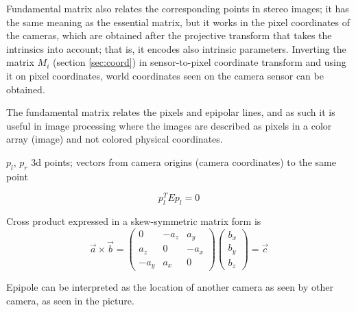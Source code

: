 Fundamental matrix also relates the corresponding points in stereo images; it has the same meaning as the essential matrix, but it works in the pixel coordinates of the cameras, which are obtained after the projective transform that takes the intrinsics into account; that is, it encodes also intrinsic parameters.
Inverting the matrix $M_i$ (section \ref{sec:coord}) in sensor-to-pixel coordinate transform and using it on pixel coordinates, world coordinates seen on the camera sensor can be obtained. %

%
%
%
%

The fundamental matrix relates the pixels and epipolar lines, and as such it is useful in image processing where the images are described as pixels in a color array (image) and not colored physical coordinates.

$p_l$, $p_r$ 3d points; vectors from camera origins (camera coordinates) to the same point

\[
	p_l^T E p_l = 0
\]


Cross product expressed in a skew-symmetric matrix form is
\begin{equation}
\vec a \times \vec b =
\begin{pmatrix}
	 0   & -a_z &  a_y\\
	 a_z &  0   & -a_x\\
	-a_y &  a_x & 0
\end{pmatrix}
\begin{pmatrix}
	b_x\\b_y\\b_z
\end{pmatrix}
= \vec c
\end{equation}

Epipole can be interpreted as the location of another camera as seen by other camera, as seen in the picture.


